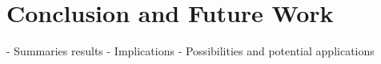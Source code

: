 \section{Conclusion and Future Work} \label{conclusion_and_future_work}

- Summaries results
- Implications
- Possibilities and potential applications